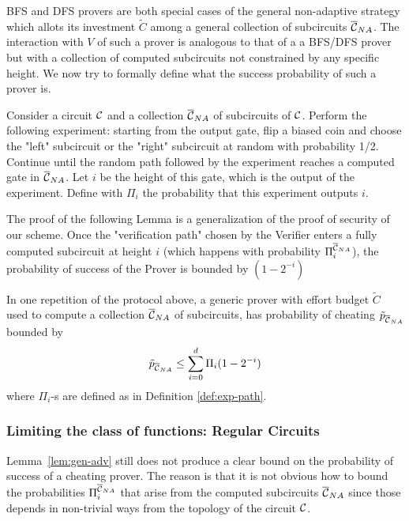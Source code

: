 BFS and DFS provers are both special cases of the general non-adaptive strategy which allots its investment $\tilde{C}$ among a general collection of subcircuits $\overline{\cal{C}}_{NA}$.
The interaction with $V$ of such a prover is analogous to that of a a BFS/DFS prover but with a collection of computed subcircuits not constrained by any specific height. We now try to formally define what the success probability of such a prover is. 

\begin{definition}
	\label{def:exp-path}
	Consider a circuit $\cal C$ and a collection $\overline{\cal{C}}_{NA}$ of subcircuits of $\cal C$. Perform the following experiment: starting from the output gate, flip a biased coin and choose the "left" subcircuit or the "right" subcircuit at random with probability 1/2. Continue until the random path followed by the experiment reaches a computed gate in $\overline{\cal{C}}_{NA}$. Let $i$ be the height of this gate, which is the output of the experiment. Define with $\Pi_i$ the probability that this experiment outputs $i$.
\end{definition}

The proof of the following Lemma is a generalization of the proof of security of our scheme. Once the "verification path" chosen by the Verifier enters a fully computed subcircuit at height $i$ (which happens with probability $\Pi_i^{\overline{\cal{C}}_{NA}}$), the probability of success of the Prover is bounded by $(1 - 2^{-i})$

\begin{lemma}
\label{lem:gen-adv}
	In one repetition of the protocol above, a generic prover with effort budget $\tilde{C}$ used to compute a collection $\overline{\cal{C}}_{NA}$ of subcircuits, has probability of cheating $\tilde{p}_{\overline{\cal{C}}_{NA}}$ bounded by
	$$ \tilde{p}_{\overline{\cal{C}}_{NA}} \leq \sum_{i=0}^{d} \Pi_i (1 - 2^{-i})$$
	where $\Pi_i$-s are defined as in Definition \ref{def:exp-path}.
\end{lemma}

\subsubsection{Limiting the class of functions: Regular Circuits}


\smallskip
\noindent
Lemma~\ref{lem:gen-adv} still does not produce a clear bound on the probability of success of a cheating prover. The reason is that it is not obvious
how to bound the probabilities $\Pi_i^{\overline{\cal{C}}_{NA}}$ that arise from the computed subcircuits $\overline{\cal{C}}_{NA}$ since those depends in non-trivial ways from the 
topology of the circuit $\cal C$. 

